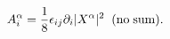 \begin{equation}
\label{complexform}
A^{\alpha}_i=\frac{1}{8}\epsilon_{ij}\partial_i|X^{\alpha}|^2\;\;{\rm (no\;sum)}.
\end{equation}

